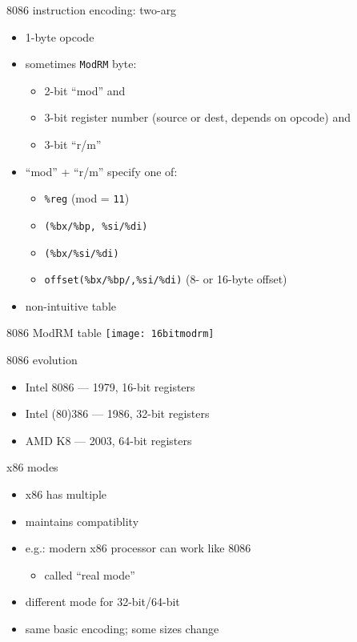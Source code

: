\begin{frame}{8086 instruction encoding: two-arg}
\begin{itemize}
    \item 1-byte opcode
    \item sometimes {\tt ModRM} byte:
        \begin{itemize}
        \item 2-bit ``mod'' and 
        \item 3-bit register number (source or dest, depends on opcode) and
        \item 3-bit ``r/m''
        \end{itemize}
    \item ``mod'' + ``r/m'' specify one of:
        \begin{itemize}
        \item {\tt \%reg} (mod = {\tt 11})
        \item {\tt (\%bx/\%bp, \%si/\%di)}
        \item {\tt (\%bx/\%si/\%di)}
        \item {\tt offset(\%bx/\%bp/,\%si/\%di)} (8- or 16-byte offset)
        \end{itemize}
    \item non-intuitive table
\end{itemize}
\end{frame}

\begin{frame}{8086 ModRM table}
\texttt{[image: 16bitmodrm]}
\end{frame}

\begin{frame}{8086 evolution}
\begin{itemize}
\item Intel 8086 --- 1979, 16-bit registers
\item Intel (80)386 --- 1986, 32-bit registers
\item AMD K8 --- 2003, 64-bit registers
\end{itemize}
\end{frame}

\begin{frame}{x86 modes}
\begin{itemize}
\item x86 has multiple 
\item maintains compatiblity
\item e.g.: modern x86 processor can work like 8086
    \begin{itemize}
    \item called ``real mode''
    \end{itemize}
\item different mode for 32-bit/64-bit
\item same basic encoding; some sizes change
\end{itemize}
\end{frame}

